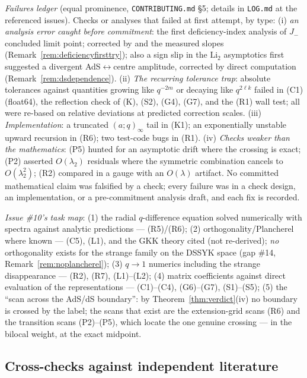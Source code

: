 \documentclass[11pt,a4paper]{article}
\theoremstyle{definition}
\theoremstyle{plain}
\begin{document}
\emph{Failures ledger} (equal prominence, \texttt{CONTRIBUTING.md} \S5; details in
\texttt{LOG.md} at the referenced issues). Checks or analyses that failed at first attempt,
by type: (i) \emph{an analysis error caught before commitment}: the first deficiency-index
analysis of $J_{-}$ concluded limit point; corrected by \cite{Koelink:2003oneparam} and the
measured slopes (Remark~\ref{rem:deficiencyfirsttry}); also a sign slip in the
$\mathrm{Li}_2$ asymptotics first suggested a divergent AdS$\leftrightarrow$centre
amplitude, corrected by direct computation (Remark~\ref{rem:dsdependence}).
(ii) \emph{The recurring tolerance trap}: absolute tolerances against quantities growing
like $q^{-2m}$ or decaying like $q^{2\ell k}$ failed in (C1) (float64), the reflection
check of (K), (S2), (G4), (G7), and the (R1) wall test; all were re-based on relative
deviations at predicted correction scales. (iii) \emph{Implementation}: a truncated
$(a;q)_{\infty}$ tail in (K1); an exponentially unstable upward recursion in (R6); two
test-code bugs in (R1). (iv) \emph{Checks weaker than the mathematics}: (P5) hunted for an
asymptotic drift where the crossing is exact; (P2) asserted $O(\lambda_2)$ residuals where
the symmetric combination cancels to $O(\lambda_2^{2})$; (R2) compared in a gauge with an
$O(\lambda)$ artifact. No committed mathematical claim was falsified by a check; every
failure was in a check design, an implementation, or a pre-commitment analysis draft, and
each fix is recorded.

\emph{Issue \#10's task map}: (1) the radial $q$-difference equation solved numerically
with spectra against analytic predictions --- (R5)/(R6); (2) orthogonality/Plancherel
where known --- (C5), (L1), and the GKK theory cited (not re-derived); \emph{no}
orthogonality exists for the strange family on the DSSYK space (gap \#14,
Remark~\ref{rem:noplancherel}); (3) $q\to1$ numerics including the strange disappearance
--- (R2), (R7), (L1)--(L2); (4) matrix coefficients against direct evaluation of the
representations --- (C1)--(C4), (G6)--(G7), (S1)--(S5); (5) the ``scan across the AdS/dS
boundary'': by Theorem~\ref{thm:verdict}(iv) no boundary is crossed by the label; the
scans that exist are the extension-grid scans (R6) and the transition scans (P2)--(P5),
which locate the one genuine crossing --- in the bilocal weight, at the exact midpoint.

\subsection{Cross-checks against independent literature}
\label{sec:crosschecks}
\end{document}
